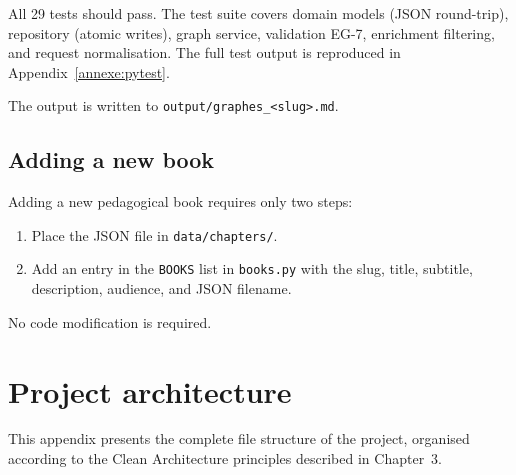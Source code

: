 All 29 tests should pass. The test suite covers domain models (JSON round-trip), repository (atomic writes), graph service, validation EG-7, enrichment filtering, and request normalisation. The full test output is reproduced in Appendix~\ref{annexe:pytest}.

The output is written to \texttt{output/graphes\_<slug>.md}.

\section{Adding a new book}

Adding a new pedagogical book requires only two steps:
\begin{enumerate}
    \item Place the JSON file in \texttt{data/chapters/}.
    \item Add an entry in the \texttt{BOOKS} list in \texttt{books.py} with the slug, title, subtitle, description, audience, and JSON filename.
\end{enumerate}
No code modification is required.


\chapter{Project architecture}
\renewcommand{\thepage}{\thechapter-\arabic{page}}

This appendix presents the complete file structure of the project, organised according to the Clean Architecture principles described in Chapter~3.


